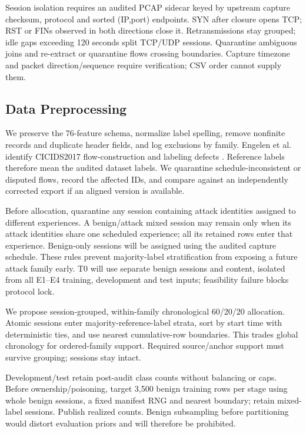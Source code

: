 \documentclass[10pt,a4paper]{article}
\begin{document}
Session isolation requires an audited PCAP sidecar keyed by upstream capture checksum, protocol and sorted (IP,port) endpoints. SYN after closure opens TCP; RST or FINs observed in both directions close it. Retransmissions stay grouped; idle gaps exceeding 120 seconds split TCP/UDP sessions. Quarantine ambiguous joins and re-extract or quarantine flows crossing boundaries. Capture timezone and packet direction/sequence require verification; CSV order cannot supply them.

\subsection{Data Preprocessing}
We preserve the 76-feature schema, normalize label spelling, remove nonfinite records and duplicate header fields, and log exclusions by family. Engelen et al. identify CICIDS2017 flow-construction and labeling defects \cite{engelen}. Reference labels therefore mean the audited dataset labels. We quarantine schedule-inconsistent or disputed flows, record the affected IDs, and compare against an independently corrected export if an aligned version is available.

Before allocation, quarantine any session containing attack identities assigned to different experiences. A benign/attack mixed session may remain only when its attack identities share one scheduled experience; all its retained rows enter that experience. Benign-only sessions will be assigned using the audited capture schedule. These rules prevent majority-label stratification from exposing a future attack family early. T0 will use separate benign sessions and content, isolated from all E1--E4 training, development and test inputs; feasibility failure blocks protocol lock.

We propose session-grouped, within-family chronological 60/20/20 allocation. Atomic sessions enter majority-reference-label strata, sort by start time with deterministic ties, and use nearest cumulative-row boundaries. This trades global chronology for ordered-family support. Required source/anchor support must survive grouping; sessions stay intact.

Development/test retain post-audit class counts without balancing or caps. Before ownership/poisoning, target 3,500 benign training rows per stage using whole benign sessions, a fixed manifest RNG and nearest boundary; retain mixed-label sessions. Publish realized counts. Benign subsampling before partitioning would distort evaluation priors and will therefore be prohibited.
\end{document}
